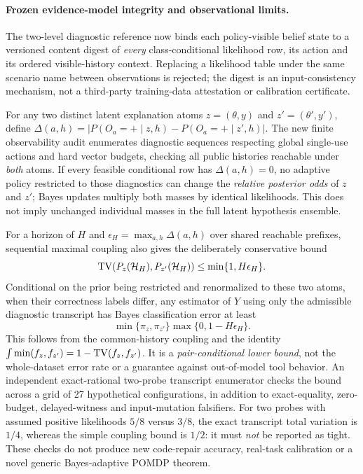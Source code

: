 \documentclass[pdflatex,sn-basic]{sn-jnl}
\begin{document}
\paragraph{Frozen evidence-model integrity and observational limits.}
The two-level diagnostic reference now binds each
policy-visible belief state to a versioned content
digest of \emph{every} class-conditional likelihood
row, its action and its ordered visible-history
context. Replacing a likelihood table under the
same scenario name between observations is
rejected; the digest is an input-consistency
mechanism, not a third-party training-data
attestation or calibration certificate.

For any two distinct latent explanation atoms
$z=(\theta,y)$ and $z'=(\theta',y')$, define
$\Delta(a,h)=|P(O_a=+\mid z,h)-
P(O_a=+\mid z',h)|$.
The new finite observability audit enumerates
diagnostic sequences respecting global single-use
actions and hard vector budgets, checking all
public histories reachable under \emph{both}
atoms. If every feasible conditional row has
$\Delta(a,h)=0$, no adaptive policy restricted to
those diagnostics can change the \emph{relative
posterior odds} of $z$ and $z'$; Bayes updates
multiply both masses by identical likelihoods.
This does not imply unchanged individual
masses in the full latent hypothesis ensemble.

For a horizon of $H$ and
$\epsilon_H=\max_{a,h}\Delta(a,h)$ over shared
reachable prefixes, sequential maximal coupling
also gives the deliberately conservative bound
\[
 {\rm TV}(P_z(\mathcal H_H),P_{z'}(\mathcal H_H))
 \leq\min\{1,H\epsilon_H\}.
\]
Conditional on the prior being restricted and
renormalized to these two atoms, when their
correctness labels differ, any estimator of $Y$
using only the admissible diagnostic transcript has
Bayes classification error at least
\[
 \min\{\pi_z,\pi_{z'}\}
 \max\{0,1-H\epsilon_H\}.
\]
This follows from the common-history coupling
and the identity
$\int\min(f_z,f_{z'})=1-{\rm TV}(f_z,f_{z'})$.
It is a \emph{pair-conditional lower bound},
not the whole-dataset error rate or a guarantee
against out-of-model tool behavior. An independent
exact-rational two-probe transcript enumerator
checks the bound across a grid of 27 hypothetical
configurations, in addition to exact-equality,
zero-budget, delayed-witness and input-mutation
falsifiers. For two probes with assumed positive
likelihoods $5/8$ versus $3/8$, the exact transcript
total variation is $1/4$, whereas the simple
coupling bound is $1/2$: it must \emph{not} be
reported as tight. These checks do not produce
new code-repair accuracy, real-task calibration
or a novel generic Bayes-adaptive POMDP theorem.
\end{document}
